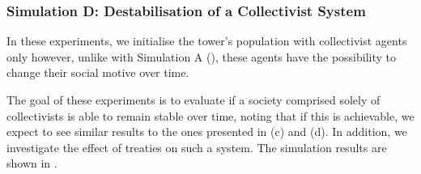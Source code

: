 



\subsubsection{Simulation D: Destabilisation of a Collectivist System}

In these experiments, we initialise the tower's population with collectivist agents only however, unlike with Simulation A (), these agents have the possibility to change their social motive over time. 

The goal of these experiments is to evaluate if a society comprised solely of collectivists is able to remain stable over time, noting that if this is achievable, we expect to see similar results to the ones presented in  (c) and (d). In addition, we investigate the effect of treaties on such a system. The simulation results are shown in .

